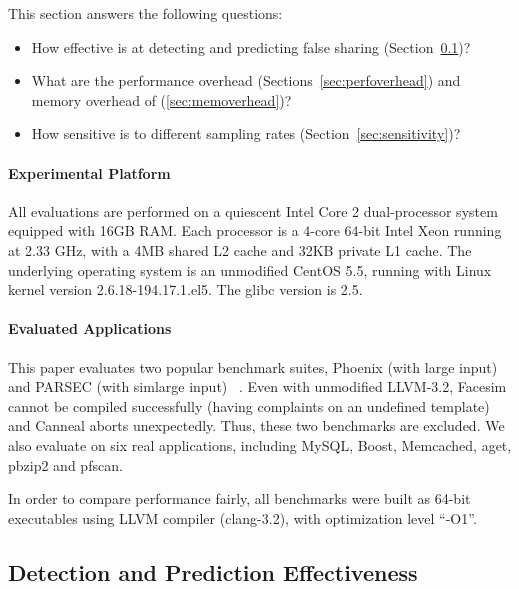 \label{sec:evaluation}

This section answers the following questions:
\begin{itemize}
\item
  How effective is \Predator{} at detecting and predicting false sharing (Section~\ref{sec:effective})?

\item
  What are the performance overhead (Sections~\ref{sec:perfoverhead}) and memory overhead of \Predator{} (\ref{sec:memoverhead})?

\item 
  How sensitive is \Predator{} to different sampling rates (Section~\ref{sec:sensitivity})? 
 
\end{itemize}

\paragraph{Experimental Platform} All evaluations are performed on a quiescent Intel Core 2 dual-processor system equipped with 
16GB RAM. Each processor is a 4-core 64-bit Intel Xeon running at 2.33 GHz, with a 4MB shared L2 cache and 32KB private L1 cache. The underlying operating system is an unmodified CentOS 5.5, running with Linux kernel version 2.6.18-194.17.1.el5. The glibc version is 2.5. %

\paragraph{Evaluated Applications} 
This paper evaluates two popular benchmark suites,
Phoenix (with large input) ~\cite{phoenix-hpca} and PARSEC (with simlarge input) ~\cite{parsec}. Even with unmodified LLVM-3.2, Facesim cannot be compiled successfully (having complaints on an undefined template) and Canneal aborts unexpectedly. Thus, these two benchmarks are excluded.
We also evaluate \Predator{} on six real applications, including MySQL, Boost, Memcached, aget, pbzip2 and pfscan.

In order to compare performance fairly, all benchmarks were built as 64-bit executables using LLVM compiler (clang-3.2), with optimization level ``-O1''.

\subsection{Detection and Prediction Effectiveness}
\label{sec:effective}

